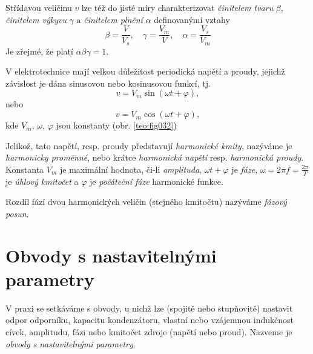     Střídavou veličinu $v$ lze též do jisté míry charakterizovat \emph{činitelem tvaru} $\beta$,
    \emph{činitelem výkyvu} $\gamma$ a \emph{činitelem plnění} $\alpha$ definovanými vztahy
    \begin{equation}\label{TEO:eq_harm07}
      \beta = \frac{V}{V_s}, \quad \gamma = \frac{V_m}{V}, \quad \alpha = \frac{V_s}{V_m}
    \end{equation}    
    Je zřejmé, že platí $\alpha\beta\gamma = 1$.
    
    V elektrotechnice mají velkou důležitost periodická napětí a proudy, jejichž závislost je dána
    sinusovou nebo kosinusovou funkcí, tj.
    \begin{equation}\label{TEO:eq_harm08}
      v = V_m\sin(\omega t + \varphi),
    \end{equation}        
    nebo
    \begin{equation}\label{TEO:eq_harm09}
      v = V_m\cos(\omega t + \varphi),
    \end{equation}  
    kde $V_m$, $\omega$, $\varphi$ jsou konstanty (obr. \ref{teo:fig032})
    
    Jelikož, tato napětí, resp. proudy představují \emph{harmonické kmity}, nazýváme je
    \emph{harmonicky proměnné}, nebo krátce \emph{harmonická napětí} resp. \emph{harmonická
    proudy}. Konstanta $V_m$ je maximální hodnota, či-li \emph{amplituda}, $\omega t + \varphi$ je
    \emph{fáze}, $\omega = 2\pi f = \frac{2\pi}{T}$ je \emph{úhlový kmitočet} a $\varphi$ je
    \emph{počáteční fáze} harmonické funkce.
    
    Rozdíl fází dvou harmonických veličin (stejného kmitočtu) nazýváme \emph{fázový posun}.
    
      
      
  \section{Obvody s nastavitelnými parametry}
    V praxi se setkáváme s obvody, u nichž lze (spojitě nebo stupňovitě) nastavit odpor odporníku, 
    kapacitu kondenzátoru, vlastní nebo vzájemnou indukčnost cívek, amplitudu, fázi nebo kmitočet
    zdroje (napětí nebo proud). Nazveme je \emph{obvody s nastavitelnými parametry}.

